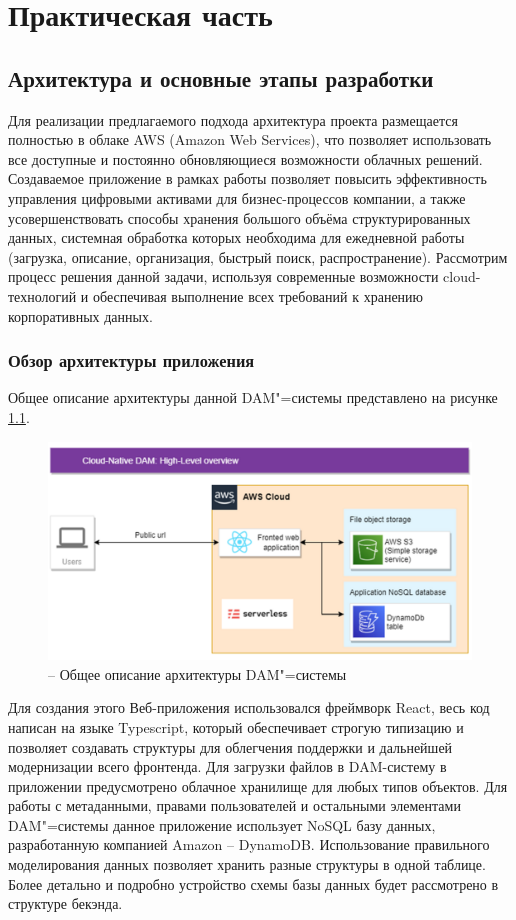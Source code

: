 \clearpage
\chapter{Практическая часть}

\section{Архитектура и основные этапы разработки}
Для реализации предлагаемого подхода архитектура проекта размещается полностью в облаке AWS (Amazon Web Services), что позволяет использовать все доступные и постоянно обновляющиеся возможности облачных решений. Создаваемое приложение в рамках работы позволяет повысить эффективность управления цифровыми активами для бизнес-процессов компании, а также усовершенствовать способы хранения большого объёма структурированных данных, системная обработка которых необходима для ежедневной работы (загрузка, описание, организация, быстрый поиск, распространение). Рассмотрим процесс решения данной задачи, используя современные возможности cloud-технологий и обеспечивая выполнение всех требований к хранению корпоративных данных. 

\subsection{Обзор архитектуры приложения}
Общее описание архитектуры данной DAM"=системы представлено на рисунке \ref{highLevelOverview}.
\begin{figure}[!ht]
    \centering
    \includegraphics[scale=0.32]{images/HighLevelOverview.png}
    \caption{-- Общее описание архитектуры DAM"=системы}
    \label{highLevelOverview}
\end{figure}

Для создания этого Веб-приложения использовался фреймворк React, весь код написан на языке Typescript, который обеспечивает строгую типизацию и позволяет создавать структуры для облегчения поддержки и дальнейшей модернизации всего фронтенда. Для загрузки файлов в DAM-систему в приложении предусмотрено облачное хранилище для любых типов объектов. Для работы с метаданными, правами пользователей и остальными элементами DAM"=системы данное приложение использует NoSQL базу данных, разработанную компанией Amazon – DynamoDB. Использование правильного моделирования данных позволяет хранить разные структуры в одной таблице. Более детально и подробно устройство схемы базы данных будет рассмотрено в структуре бекэнда.

